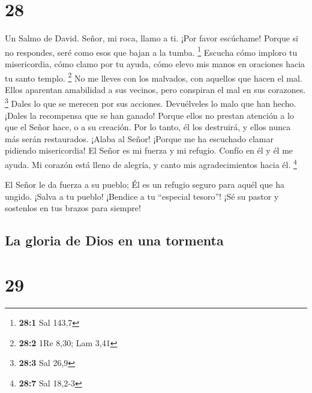 \hypertarget{section-27}{%
\section{28}\label{section-27}}

Un Salmo de David.  Señor, mi roca, llamo a ti. ¡Por favor
escúchame! Porque si no respondes, seré como esos que bajan a la tumba.
\footnote{\textbf{28:1} Sal 143,7}  Escucha cómo imploro tu
misericordia, cómo clamo por tu ayuda, cómo elevo mis manos en oraciones
hacia tu santo templo. \footnote{\textbf{28:2} 1Re 8,30; Lam 3,41}
 No me lleves con los malvados, con aquellos que hacen el
mal. Ellos aparentan amabilidad a sus vecinos, pero conspiran el mal en
sus corazones. \footnote{\textbf{28:3} Sal 26,9}  Dales lo
que se merecen por sus acciones. Devuélveles lo malo que han hecho.
¡Dales la recompensa que se han ganado!  Porque ellos no
prestan atención a lo que el Señor hace, o a su creación. Por lo tanto,
él los destruirá, y ellos nunca más serán restaurados. 
¡Alaba al Señor! ¡Porque me ha escuchado clamar pidiendo misericordia!
 El Señor es mi fuerza y mi refugio. Confío en él y él me
ayuda. Mi corazón está lleno de alegría, y canto mis agradecimientos
hacia él. \footnote{\textbf{28:7} Sal 18,2-3}

 El Señor le da fuerza a su pueblo; Él es un refugio seguro
para aquél que ha ungido.  ¡Salva a tu pueblo! ¡Bendice a tu
``especial tesoro''! ¡Sé su pastor y sostenlos en tus brazos para
siempre!

\hypertarget{la-gloria-de-dios-en-una-tormenta}{%
\subsection{La gloria de Dios en una
tormenta}\label{la-gloria-de-dios-en-una-tormenta}}

\hypertarget{section-28}{%
\section{29}\label{section-28}}

